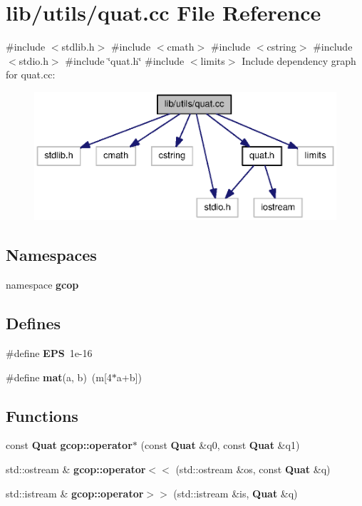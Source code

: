\section{lib/utils/quat.cc \-File \-Reference}
\label{quat_8cc}
{\ttfamily \#include $<$stdlib.\-h$>$}\*
{\ttfamily \#include $<$cmath$>$}\*
{\ttfamily \#include $<$cstring$>$}\*
{\ttfamily \#include $<$stdio.\-h$>$}\*
{\ttfamily \#include \char`\"{}quat.\-h\char`\"{}}\*
{\ttfamily \#include $<$limits$>$}\*
\-Include dependency graph for quat.\-cc\-:
\nopagebreak
\begin{figure}[H]
\begin{center}
\leavevmode
\includegraphics[width=350pt]{quat_8cc__incl}
\end{center}
\end{figure}
\subsection*{\-Namespaces}
\begin{DoxyCompactItemize}
\item 
namespace {\bf gcop}
\end{DoxyCompactItemize}
\subsection*{\-Defines}
\begin{DoxyCompactItemize}
\item 
\#define {\bf \-E\-P\-S}~1e-\/16
\item 
\#define {\bf mat}(a, b)~(m[4$\ast$a+b])
\end{DoxyCompactItemize}
\subsection*{\-Functions}
\begin{DoxyCompactItemize}
\item 
const {\bf \-Quat} {\bf gcop\-::operator$\ast$} (const {\bf \-Quat} \&q0, const {\bf \-Quat} \&q1)
\item 
std\-::ostream \& {\bf gcop\-::operator$<$$<$} (std\-::ostream \&os, const {\bf \-Quat} \&q)
\item 
std\-::istream \& {\bf gcop\-::operator$>$$>$} (std\-::istream \&is, {\bf \-Quat} \&q)
\end{DoxyCompactItemize}
